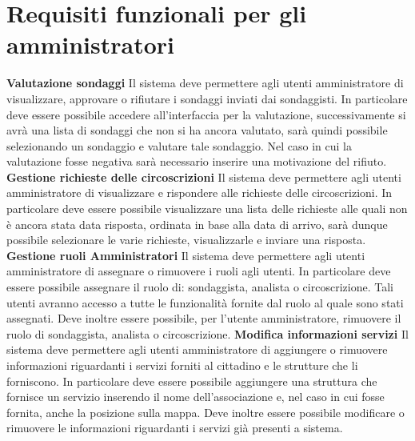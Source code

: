     \section{Requisiti funzionali per gli amministratori}
        \begin{rfList}
            \rfItem \textbf{Valutazione sondaggi} Il sistema deve permettere agli utenti amministratore di visualizzare, approvare o rifiutare i sondaggi inviati dai sondaggisti. In particolare deve essere possibile accedere all'interfaccia per la valutazione, successivamente si avrà una lista di sondaggi che non si ha ancora valutato, sarà quindi possibile selezionando un sondaggio e valutare tale sondaggio. Nel caso in cui la valutazione fosse negativa sarà necessario inserire una motivazione del rifiuto.
            \rfItem \textbf{Gestione richieste delle circoscrizioni} Il sistema deve permettere agli utenti amministratore di visualizzare e rispondere alle richieste delle circoscrizioni. In particolare deve essere possibile visualizzare una lista delle richieste alle quali non è ancora stata data risposta, ordinata in base alla data di arrivo, sarà dunque possibile selezionare le varie richieste, visualizzarle e inviare una risposta.
            \rfItem \textbf{Gestione ruoli Amministratori} Il sistema deve permettere agli utenti amministratore di assegnare o rimuovere i ruoli agli utenti. In particolare deve essere possibile assegnare il ruolo di: sondaggista, analista o circoscrizione. Tali utenti avranno accesso a tutte le funzionalità fornite dal ruolo al quale sono stati assegnati. Deve inoltre essere possibile, per l'utente amministratore, rimuovere il ruolo di sondaggista, analista o circoscrizione.
            \rfItem \textbf{Modifica informazioni servizi} Il sistema deve permettere agli utenti amministratore di aggiungere o rimuovere informazioni riguardanti i servizi forniti al cittadino e le strutture che li forniscono. In particolare deve essere possibile aggiungere una struttura che fornisce un servizio inserendo il nome dell'associazione e, nel caso in cui fosse fornita, anche la posizione sulla mappa. Deve inoltre essere possibile modificare o rimuovere le informazioni riguardanti i servizi già presenti a sistema.
        \end{rfList}